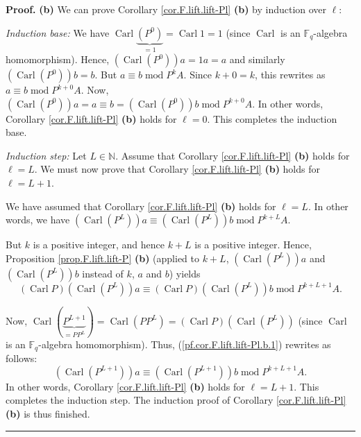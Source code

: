 \documentclass[numbers=enddot,12pt,final,onecolumn,notitlepage]{scrartcl}%
\theoremstyle{definition}
\newenvironment{proof}[1][Proof]{\noindent\textbf{#1.} }{\ \rule{0.5em}{0.5em}}
\begin{document}
\begin{proof}
\textbf{(b)} We can prove Corollary \ref{cor.F.lift.lift-Pl} \textbf{(b)} by
induction over $\ell$:

\textit{Induction base:} We have $\operatorname*{Carl}\underbrace{\left(
P^{0}\right)  }_{=1}=\operatorname*{Carl}1=1$ (since $\operatorname*{Carl}$ is
an $\mathbb{F}_{q}$-algebra homomorphism). Hence, $\left(
\operatorname*{Carl}\left(  P^{0}\right)  \right)  a=1a=a$ and similarly
$\left(  \operatorname*{Carl}\left(  P^{0}\right)  \right)  b=b$. But $a\equiv
b\operatorname{mod}P^{k}A$. Since $k+0=k$, this rewrites as $a\equiv
b\operatorname{mod}P^{k+0}A$. Now, $\left(  \operatorname*{Carl}\left(
P^{0}\right)  \right)  a=a\equiv b=\left(  \operatorname*{Carl}\left(
P^{0}\right)  \right)  b\operatorname{mod}P^{k+0}A$. In other words, Corollary
\ref{cor.F.lift.lift-Pl} \textbf{(b)} holds for $\ell=0$. This completes the
induction base.

\textit{Induction step:} Let $L\in\mathbb{N}$. Assume that Corollary
\ref{cor.F.lift.lift-Pl} \textbf{(b)} holds for $\ell=L$. We must now prove
that Corollary \ref{cor.F.lift.lift-Pl} \textbf{(b)} holds for $\ell=L+1$.

We have assumed that Corollary \ref{cor.F.lift.lift-Pl} \textbf{(b)} holds for
$\ell=L$. In other words, we have $\left(  \operatorname*{Carl}\left(
P^{L}\right)  \right)  a\equiv\left(  \operatorname*{Carl}\left(
P^{L}\right)  \right)  b\operatorname{mod}P^{k+L}A$.

But $k$ is a positive integer, and hence $k+L$ is a positive integer. Hence,
Proposition \ref{prop.F.lift.lift-P} \textbf{(b)} (applied to $k+L$, $\left(
\operatorname*{Carl}\left(  P^{L}\right)  \right)  a$ and $\left(
\operatorname*{Carl}\left(  P^{L}\right)  \right)  b$ instead of $k$, $a$ and
$b$) yields
\begin{equation}
\left(  \operatorname*{Carl}P\right)  \left(  \operatorname*{Carl}\left(
P^{L}\right)  \right)  a\equiv\left(  \operatorname*{Carl}P\right)  \left(
\operatorname*{Carl}\left(  P^{L}\right)  \right)  b\operatorname{mod}%
P^{k+L+1}A. \label{pf.cor.F.lift.lift-Pl.b.1}%
\end{equation}


Now, $\operatorname*{Carl}\left(  \underbrace{P^{L+1}}_{=PP^{L}}\right)
=\operatorname*{Carl}\left(  PP^{L}\right)  =\left(  \operatorname*{Carl}%
P\right)  \left(  \operatorname*{Carl}\left(  P^{L}\right)  \right)  $ (since
$\operatorname*{Carl}$ is an $\mathbb{F}_{q}$-algebra homomorphism). Thus,
(\ref{pf.cor.F.lift.lift-Pl.b.1}) rewrites as follows:%
\[
\left(  \operatorname*{Carl}\left(  P^{L+1}\right)  \right)  a\equiv\left(
\operatorname*{Carl}\left(  P^{L+1}\right)  \right)  b\operatorname{mod}%
P^{k+L+1}A.
\]
In other words, Corollary \ref{cor.F.lift.lift-Pl} \textbf{(b)} holds for
$\ell=L+1$. This completes the induction step. The induction proof of
Corollary \ref{cor.F.lift.lift-Pl} \textbf{(b)} is thus finished.
\end{proof}
\end{document}
